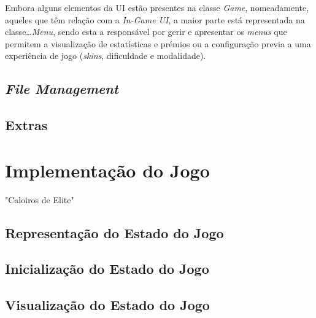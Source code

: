 \documentclass[a4paper,11pt]{article}
\newcommand\tab[1][0.8cm]{\hspace*{#1}}
\begin{document}
\vspace{8pt}

Embora alguns elementos da UI estão presentes na classe \textit{Game}, nomeadamente, aqueles que têm relação com a \textit{In-Game UI}, a maior parte está representada na classe\dots \textit{Menu}, sendo esta a responsável por gerir e apresentar os \textit{menus} que permitem a visualização de estatísticas e prémios ou a configuração previa a uma experiência de jogo (\textit{skins}, dificuldade e modalidade).


\vspace{8pt}

\subsection*{\textit{File Management}}

\vspace{8pt}

\subsection*{Extras}

\vspace{8pt}


\pagebreak

\section{Implementação do Jogo}

\vspace{8pt}

\tab

"Caloiros de Elite" 

\vspace{8pt}

\subsection{Representação do Estado do Jogo}
\pagebreak

\subsection{Inicialização do Estado do Jogo}
\pagebreak

\subsection{Visualização do Estado do Jogo}
\pagebreak
\end{document}
